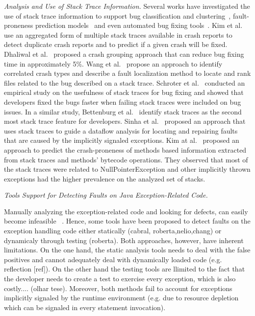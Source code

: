 \documentclass[conference]{IEEEtran}
\begin{document}
\textit{Analysis and Use of Stack Trace Information.} Several works have
investigated the use of stack trace information to support bug classification
and clustering~\cite{wang2013improving, kim2011crash, dhaliwal2011classifying},
fault-proneness prediction models~\cite{kim2013predicting} and even automated
bug fixing tools~\cite{sinha2009fault}. Kim et al.~\cite{kim2011crash} use an
aggregated form of multiple stack traces available in crash reports to detect
duplicate crash reports and to predict if a given crash will be fixed. Dhaliwal
et al.~\cite{dhaliwal2011classifying} proposed a crash grouping approach that
can reduce bug fixing time in approximately 5\%. Wang et
al.~\cite{wang2013improving} propose an approach to identify correlated crash
types and describe a fault localization method to locate and rank files related
to the bug described on a stack trace. Schroter et al.~\cite{schroter2010stack}
conducted an empirical study on the usefulness of stack traces for bug fixing
and showed that developers fixed the bugs faster when failing stack traces were
included on bug issues.  In a similar study, Bettenburg et
al.~\cite{bettenburg2008makes} identify stack traces as the second most stack
trace feature for developers.  Sinha et al.~\cite{sinha2009fault} proposed an
approach that uses stack traces to guide a dataflow analysis for locating and
repairing faults that are caused by the implicitly signaled exceptions. Kim
at al.~\cite{kim2013predicting} proposed an approach to predict the
crash-proneness of methods based information extracted from stack traces and
methods' bytecode operations.  They observed that most of the stack traces were
related to NullPointerException and other implicitly thrown exceptions had
the higher prevalence on the analyzed set of stacks.


\textit{Tools Support for Detecting Faults on Java Exception-Related Code.} 

Manually analyzing the exception-related code and looking for defects, can easily 
become infeasible ~\cite{Robil00}. Hence, some tools have been proposed to detect faults 
on the exception handling code either statically (cabral, roberta,nelio,chang) 
or dynamicaly through testing (roberta). Both approaches, however, have inherent
 limitations. On the one hand, the static analysis tools needs to deal with the false 
positives and cannot adequately deal with dynamically loaded code (e.g. reflection  
[ref]). On the other hand the testing tools are llimited to the fact that the developer
 needs to create a test to exercise every exception, which is also costly.... (olhar tese). 
Moreover, both methods fail to account for exceptions implicitly signaled by the runtime 
environment (e.g. due to resource depletion which can be signaled in every statement invocation). 
\end{document}
